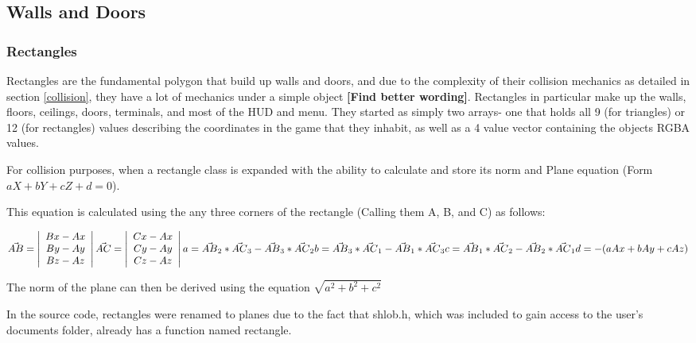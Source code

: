 \documentclass{article}
\begin{document}
\subsection{Walls and Doors}

\subsubsection{Rectangles}
Rectangles are the fundamental polygon that build up walls and doors, and due to the complexity of their collision mechanics as detailed in section \ref{collision}, they have a lot of mechanics under a simple object \textbf{[Find better wording]}. Rectangles in particular make up the walls, floors, ceilings, doors, terminals, and most of the HUD and menu. They started as simply two arrays- one that holds all 9 (for triangles) or 12 (for rectangles) values describing the coordinates in the game that they inhabit, as well as a 4 value vector containing the objects RGBA values.

For collision purposes, when a rectangle class is expanded with the ability to calculate and store its norm and Plane equation (Form $aX + bY + cZ + d = 0$).

This equation is calculated using the any three corners of the rectangle (Calling them A, B, and C) as follows:

\noindent
$
\vec{AB} = \left| \begin{array}{c}
Bx - Ax \\
By - Ay \\
Bz - Az
\end{array} \right|
\vec{AC} = \left| \begin{array}{c}
Cx - Ax \\
Cy - Ay \\
Cz - Az
\end{array} \right| \\
a = \vec{AB}_2 * \vec{AC}_3 - \vec{AB}_3 * \vec{AC}_2 \\
b = \vec{AB}_3 * \vec{AC}_1 - \vec{AB}_1 * \vec{AC}_3 \\
c = \vec{AB}_1 * \vec{AC}_2 - \vec{AB}_2 * \vec{AC}_1 \\
d = -(aAx + bAy + cAz)
$

\cite{Plane}

The norm of the plane can then be derived using the equation $\sqrt{a^2 + b^2 + c^2}$

In the source code, rectangles were renamed to planes due to the fact that shlob.h, which was included to gain access to the user's documents folder, already has a function named rectangle. 
\end{document}
